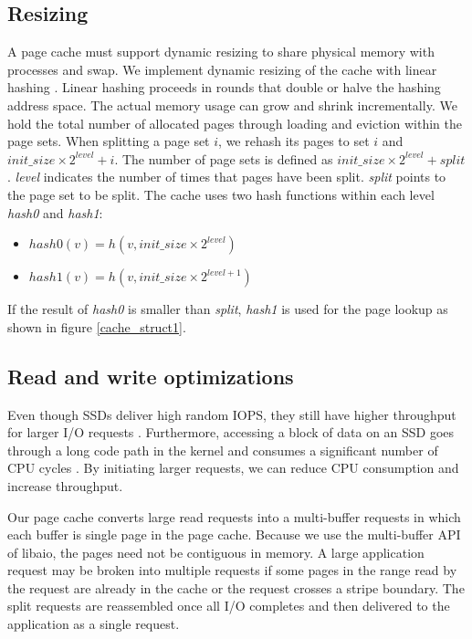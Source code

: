 \subsection{Resizing}

A page cache must support dynamic resizing to share physical memory with
processes and swap.  We implement dynamic resizing of the cache with 
linear hashing \cite{linear_hash}.  
Linear hashing proceeds in rounds that double or halve
the hashing address space. The actual 
memory usage can grow and shrink incrementally.  
We hold the total number of allocated pages through loading and eviction
within the page sets.
When splitting a page set $i$, we rehash its pages 
to set $i$ and $init\_size \times 2^{level}+i$. 
The number of page sets
is defined as $init\_size \times 2^{level} + split$. \textit{level} indicates
the number of times that pages have been split.  
\textit{split} points to the page set to be split. 
The cache uses two hash functions within each level \textit{hash0} and \textit{hash1}:
\vspace{-10pt}
\begin{itemize}
  \addtolength{\itemsep}{-5pt}
	\item $hash0(v) = h(v, init\_size \times 2^{level})$
	\item $hash1(v) = h(v, init\_size \times 2^{level + 1})$
\end{itemize}
\vspace{-10pt}
If the result of \textit{hash0} is smaller than \textit{split}, \textit{hash1}
is used for the page lookup as shown in figure \ref{cache_struct1}.

\subsection{Read and write optimizations}\label{rw_opt}
Even though SSDs deliver high random IOPS, they still have higher throughput
for larger I/O requests \cite{uflip}.
Furthermore, accessing a block of data on an SSD goes through a long code
path in the kernel and consumes a significant number of CPU cycles \cite{Foong10}.
By initiating larger requests, we can reduce CPU consumption and increase
throughput.

Our page cache converts large read requests into a multi-buffer requests
in which each buffer is single page in the page cache.  Because we use the 
multi-buffer API of libaio, the pages need not be contiguous in memory.  
A large application request may be broken into
multiple requests if some pages in the range read by the request are already 
in the cache or the request crosses a stripe boundary.
The split requests are reassembled once all I/O completes and then 
delivered to the application as a single request.

